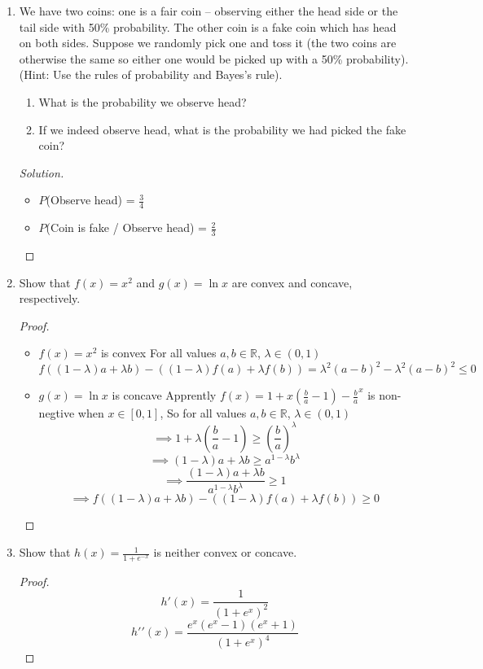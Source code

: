 \documentclass{article}
\newenvironment{solution}
  {\renewcommand\qedsymbol{$\blacksquare$}\begin{proof}[Solution]}
  {\end{proof}}
\begin{document}
\begin{enumerate}
\begin{solution}
\end{solution}
\bigskip
\item We have two coins: one is a fair coin -- observing either the head side or the tail side with 50\% probability. 
The other coin is a fake coin which has head on both sides. Suppose we randomly pick one and toss it (the two coins are otherwise the same so either one would be picked up with a 50\% probability). (Hint: Use the rules of probability and Bayes's rule).
\begin{enumerate}
	\item What is the probability we observe head?
	\item If we indeed observe head, what is the probability we had picked the fake coin?
\end{enumerate}
\begin{solution}
    \begin{itemize}
        \item $P$(Observe head) = $\frac{3}{4}$
        \item $P$(Coin is fake / Observe head) = $\frac{2}{3}$
    \end{itemize}
\end{solution}
\bigskip
\item 	Show that $f(x)=x^2$ and $g(x)=\ln x$ are convex and concave, respectively.
\begin{proof}
    \begin{itemize}
        \item $f(x)=x^2$ is convex\newline
            For all values $a, b \in \mathbb{R} $, $\lambda \in (0, 1)$
            \[
                f((1- \lambda)a + {\lambda}b) - ((1 - \lambda)f(a) + {\lambda}f(b))
                =  \lambda^{2}(a-b)^{2} - \lambda^{2}(a-b)^2
                \leq 0
            \]

        \item
            $g(x)=\ln x$ is concave\newline
            Apprently $f(x) = 1 + x(\frac{b}{a} - 1) - \frac{b}{a}^{x}$ is
            non-negtive when $x \in [0, 1]$, So for all values $a, b \in \mathbb{R} $, $\lambda \in (0, 1)$
            \[
                \implies
                1 + \lambda(\frac{b}{a} - 1) \geq (\frac{b}{a})^{\lambda}
            \]
            \[
                \implies
                (1- \lambda)a + {\lambda}b \geq a^{1-\lambda} b^{\lambda}
            \]
            \[
                \implies
                \frac{(1- \lambda)a + {\lambda}b}{a^{1-\lambda} b^{\lambda}} \geq 1
            \]
            \[
                \implies
                f((1- \lambda)a + {\lambda}b) - ((1 - \lambda)f(a) + {\lambda}f(b)) \geq 0
            \]
    \end{itemize}
\end{proof}
\bigskip
\item Show that $h(x)=\frac{1}{1+e^{-x}}$ is neither convex or concave.
\begin{proof}
    \[h\prime(x) =  \frac{1}{(1 + e^{x})^{2}}\]
    \[h\prime\prime(x) =  \frac{e^{x}(e^{x}-1)(e^{x}+1)}{(1 + e^{x})^{4}}\]


\end{proof}
\end{enumerate}
\end{document}

